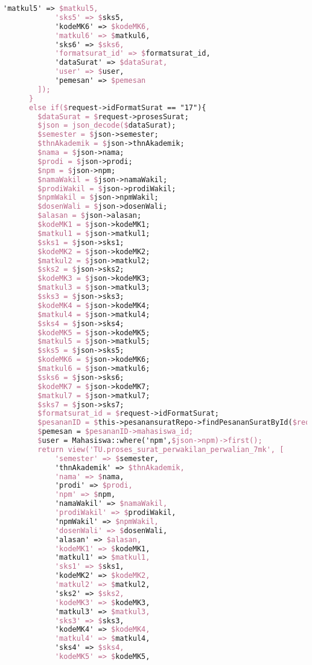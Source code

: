 \begin{lstlisting}[language=tex,basicstyle=\tiny,caption=PesanansuratController.php]
            'matkul5' => $matkul5,
            'sks5' => $sks5,
            'kodeMK6' => $kodeMK6,
            'matkul6' => $matkul6,
            'sks6' => $sks6,
            'formatsurat_id' => $formatsurat_id,
            'dataSurat' => $dataSurat,
            'user' => $user,
            'pemesan' => $pemesan
        ]);
      }
      else if($request->idFormatSurat == "17"){
        $dataSurat = $request->prosesSurat;
        $json = json_decode($dataSurat);
        $semester = $json->semester;
        $thnAkademik = $json->thnAkademik;
        $nama = $json->nama;
        $prodi = $json->prodi;
        $npm = $json->npm;
        $namaWakil = $json->namaWakil;
        $prodiWakil = $json->prodiWakil;
        $npmWakil = $json->npmWakil;
        $dosenWali = $json->dosenWali;
        $alasan = $json->alasan;
        $kodeMK1 = $json->kodeMK1;
        $matkul1 = $json->matkul1;
        $sks1 = $json->sks1;
        $kodeMK2 = $json->kodeMK2;
        $matkul2 = $json->matkul2;
        $sks2 = $json->sks2;
        $kodeMK3 = $json->kodeMK3;
        $matkul3 = $json->matkul3;
        $sks3 = $json->sks3;
        $kodeMK4 = $json->kodeMK4;
        $matkul4 = $json->matkul4;
        $sks4 = $json->sks4;
        $kodeMK5 = $json->kodeMK5;
        $matkul5 = $json->matkul5;
        $sks5 = $json->sks5;
        $kodeMK6 = $json->kodeMK6;
        $matkul6 = $json->matkul6;
        $sks6 = $json->sks6;
        $kodeMK7 = $json->kodeMK7;
        $matkul7 = $json->matkul7;
        $sks7 = $json->sks7;
        $formatsurat_id = $request->idFormatSurat;
        $pesananID = $this->pesanansuratRepo->findPesananSuratById($request->id);
        $pemesan = $pesananID->mahasiswa_id;
        $user = Mahasiswa::where('npm',$json->npm)->first();
        return view('TU.proses_surat_perwakilan_perwalian_7mk', [
            'semester' => $semester,
            'thnAkademik' => $thnAkademik,
            'nama' => $nama,
            'prodi' => $prodi,
            'npm' => $npm,
            'namaWakil' => $namaWakil,
            'prodiWakil' => $prodiWakil,
            'npmWakil' => $npmWakil,
            'dosenWali' => $dosenWali,
            'alasan' => $alasan,
            'kodeMK1' => $kodeMK1,
            'matkul1' => $matkul1,
            'sks1' => $sks1,
            'kodeMK2' => $kodeMK2,
            'matkul2' => $matkul2,
            'sks2' => $sks2,
            'kodeMK3' => $kodeMK3,
            'matkul3' => $matkul3,
            'sks3' => $sks3,
            'kodeMK4' => $kodeMK4,
            'matkul4' => $matkul4,
            'sks4' => $sks4,
            'kodeMK5' => $kodeMK5,

\end{lstlisting}
